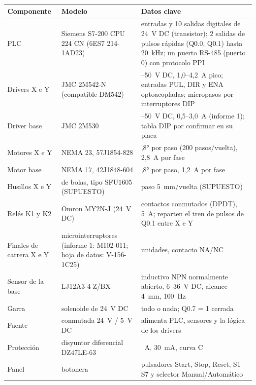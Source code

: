 \begin{center}\small
\begin{longtable}{>{\raggedright}p{3.2cm} >{\raggedright}p{4cm} >{\raggedright\arraybackslash}p{7.8cm}}
\toprule
\textbf{Componente} & \textbf{Modelo} & \textbf{Datos clave}\\
\midrule
\endhead
PLC & Siemens S7-200 CPU 224 CN (6ES7 214-1AD23) & 14 entradas y 10 salidas digitales de 24~V DC (transistor); 2 salidas de pulsos rápidas (Q0.0, Q0.1) hasta 20~kHz; un puerto RS-485 (puerto 0) con protocolo PPI\\
Drivers X e Y & JMC 2M542-N (compatible DM542) & 20--50~V DC, 1,0--4,2~A pico; entradas PUL, DIR y ENA optoacopladas; micropasos por interruptores DIP\\
Driver base & JMC 2M530 & 18--50~V DC, 0,5--3,0~A (informe 1); tabla DIP por confirmar en su placa\\
Motores X e Y & NEMA 23, 57J1854-828 & 1,8° por paso (200 pasos/vuelta), 2,8~A por fase\\
Motor base & NEMA 17, 42J1848-604 & 1,8° por paso, 1,2~A por fase\\
Husillos X e Y & de bolas, tipo SFU1605 (SUPUESTO) & paso 5~mm/vuelta (SUPUESTO)\\
Relés K1 y K2 & Omron MY2N-J (24~V DC) & 2 contactos conmutados (DPDT), 5~A; reparten el tren de pulsos de Q0.1 entre X e Y\\
Finales de carrera X e Y & microinterruptores (informe 1: M102-011; hoja de datos: V-156-1C25) & 4 unidades, contacto NA/NC\\
Sensor de la base & LJ12A3-4-Z/BX & inductivo NPN normalmente abierto, 6--36~V DC, alcance 4~mm, 100~Hz\\
Garra & solenoide de 24~V DC & todo o nada; Q0.7 = 1 cerrada\\
Fuente & conmutada 24~V / 5~V DC & alimenta PLC, sensores y la lógica de los drivers\\
Protección & disyuntor diferencial DZ47LE-63 & 16~A, 30~mA, curva C\\
Panel & botonera & pulsadores Start, Stop, Reset, S1--S7 y selector Manual/Automático\\
\bottomrule
\end{longtable}
\end{center}

